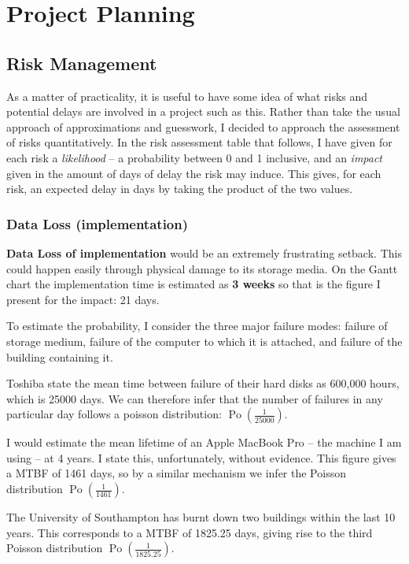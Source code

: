 \chapter{Project Planning}
\section{Risk Management}
As a matter of practicality, it is useful to have some idea of what risks
and potential delays are involved in a project such as this. Rather than
take the usual approach of approximations and guesswork, I decided to
approach the assessment of risks quantitatively. In the risk assessment
table that follows, I have given for each risk a \emph{likelihood} -- a
probability between 0 and 1 inclusive, and an \emph{impact} given in the
amount of days of delay the risk may induce. This gives, for each risk, an
expected delay in days by taking the product of the two values.

\subsection{Data Loss (implementation)}

\textbf{Data Loss of implementation} would be an extremely frustrating
setback. This could happen easily through physical damage to its storage
media. On the Gantt chart the implementation time is estimated as \textbf{3
weeks} so that is the figure I present for the impact: 21 days.

To estimate the probability, I consider the three major failure modes:
failure of storage medium, failure of the computer to which it is attached,
and failure of the building containing it.

Toshiba state the mean time between failure of their hard disks as
600,000 hours, which is 25000 days. We can therefore
infer that the number of failures in any particular day follows a
poisson distribution: $\operatorname{Po}(\frac{1}{25000})$.

I would estimate the mean lifetime of an Apple MacBook Pro -- the machine I
am using -- at 4 years. I state this, unfortunately, without evidence. This
figure gives a MTBF of 1461 days, so by a similar mechanism we infer the
Poisson distribution $\operatorname{Po}(\frac{1}{1461})$.

The University of Southampton has burnt down two buildings within
the last 10 years\cite{fireRecord, fireRecord2}. This corresponds
to a MTBF of 1825.25 days, giving rise to the third Poisson
distribution $\operatorname{Po}(\frac{1}{1825.25})$.

